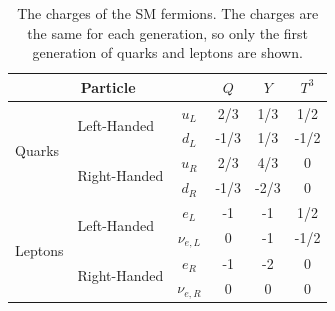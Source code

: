 \begin{table}[ht]
\centering
\begin{tabular}{llc|ccc}
  \multicolumn{3}{c|}{Particle} & $Q$ & $Y$ & $T^3$\\
\hline
\hline
\multirow{4}{*}{Quarks} & \multirow{2}{*}{Left-Handed}&  $u_L$   &  2/3  &1/3 & 1/2  \\
                       &                              &  $d_L$  & -1/3   &1/3& -1/2 \\
		       \cline{2-6}
                       &\multirow{2}{*}{Right-Handed}&  $u_R$   & 2/3  & 4/3 & 0 \\
                       &                             &  $d_R$  & -1/3   &-2/3& 0\\
\hline
\hline
\multirow{4}{*}{Leptons}&\multirow{2}{*}{Left-Handed} &$e_L$     & -1  & -1& 1/2\\
                        &                             & $\nu_{e,L}$  & 0 &-1&-1/2 \\
		       \cline{2-6}
                        &\multirow{2}{*}{Right-Handed} &$e_R$     & -1  & -2& 0\\
                        &                              & $\nu_{e,R}$  & 0 &0 &0 \\
\end{tabular}
\caption{The charges of the SM fermions. The charges are the same
for each generation, so only the first generation of quarks
and leptons are shown.  } %
\label{tab:ewcharges}
\end{table}


